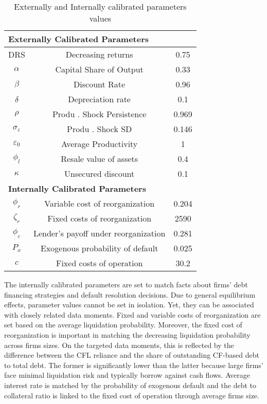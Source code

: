 \documentclass[12pt]{article}
\begin{document}
\begin{table}[h!]
    \centering
    \begin{tabular}{c|c|c}
    \multicolumn{3}{l}{\textbf{Externally Calibrated Parameters}} \\ 
    \midrule
    DRS & Decreasing returns & 0.75 \\
    $\alpha$ & Capital Share of Output & 0.33 \\
    $\beta$ & Discount Rate & 0.96 \\
    $\delta$ & Depreciation rate & 0.1 \\
    $\rho$ & Produ . Shock Persistence & 0.969 \\
    $\sigma_{\varepsilon}$ & Produ . Shock SD & 0.146 \\
    $\varepsilon_0$ & Average Productivity & 1 \\
    $\phi_l$ & Resale value of assets & 0.4 \\
    $\kappa$ & Unsecured discount & 0.1 \vspace{3mm} \\
    \multicolumn{3}{l}{\textbf{Internally Calibrated Parameters}} \\ 
    \midrule
    $\phi_r$ & Variable cost of reorganization & 0.204 \\
    $\zeta_r$ & Fixed costs of reorganization & 2590 \\
    $ \phi_c $ & Lender's payoff under reorganization  & 0.281 \\
    $P_x$ & Exogenous probability of default & 0.025 \\
    $ c $ & Fixed costs of operation & 30.2 \\
    \bottomrule
    \end{tabular}
    \caption{Externally and Internally calibrated parameters values}
    \label{tab:external calib}
\end{table}

\noindent The internally calibrated parameters are set to match facts about firms' debt financing strategies and default resolution decisions. Due to general equilibrium effects, parameter values cannot be set in isolation. Yet, they can be associated with closely related data moments. Fixed and variable costs of reorganization are set based on the average liquidation probability. Moreover, the fixed cost of reorganization is important in matching the decreasing liquidation probability across firms sizes. On the targeted data moments, this is reflected by the difference between the CFL reliance and the share of outstanding CF-based debt to total debt. The former is significantly lower than the latter because large firms' face minimal liquidation risk and typically borrow against cash flows. Average interest rate is matched by the probability of exogenous default and the debt to collateral ratio is linked to the fixed cost of operation through average firms size. 
\end{document}
